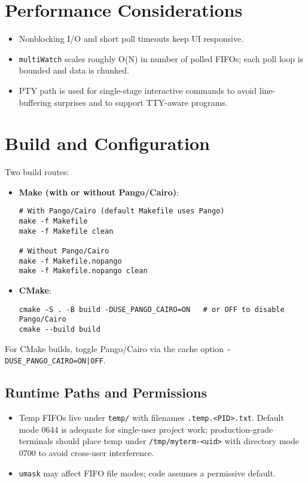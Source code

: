 \documentclass[11pt,a4paper]{article}
\begin{document}
\section{Performance Considerations}
\begin{itemize}[leftmargin=*]
  \item Nonblocking I/O and short poll timeouts keep UI responsive.
  \item \texttt{multiWatch} scales roughly O(N) in number of polled FIFOs; each poll loop is bounded and data is chunked.
  \item PTY path is used for single-stage interactive commands to avoid line-buffering surprises and to support TTY-aware programs.
\end{itemize}

\section{Build and Configuration}
Two build routes:
\begin{itemize}[leftmargin=*]
  \item \textbf{Make (with or without Pango/Cairo)}:
\begin{lstlisting}[style=code]
# With Pango/Cairo (default Makefile uses Pango)
make -f Makefile
make -f Makefile clean

# Without Pango/Cairo
make -f Makefile.nopango
make -f Makefile.nopango clean
\end{lstlisting}
  \item \textbf{CMake}:
\begin{lstlisting}[style=code]
cmake -S . -B build -DUSE_PANGO_CAIRO=ON   # or OFF to disable Pango/Cairo
cmake --build build
\end{lstlisting}
\end{itemize}
For CMake builds, toggle Pango/Cairo via the cache option \texttt{-DUSE\_PANGO\_CAIRO=ON|OFF}.

\subsection{Runtime Paths and Permissions}
\begin{itemize}[leftmargin=*]
  \item Temp FIFOs live under \texttt{temp/} with filenames \texttt{.temp.<PID>.txt}. Default mode 0644 is adequate for single-user project work; production-grade terminals should place temp under \texttt{/tmp/myterm-<uid>} with directory mode 0700 to avoid cross-user interference.
  \item \texttt{umask} may affect FIFO file modes; code assumes a permissive default.
\end{itemize}
\end{document}
